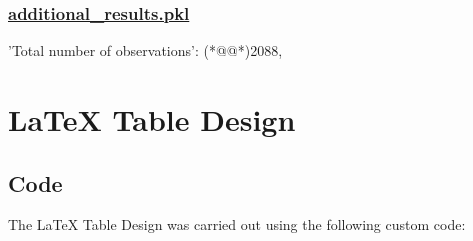 \documentclass[11pt]{article}
\begin{document}
\subsubsection*{\hyperlink{code-Data Analysis-additional-results-pkl}{additional\_results.pkl}}

\begin{codeoutput}
{
    'Total number of observations': (*@@*)2088,
}
\end{codeoutput}

\section{LaTeX Table Design}
\subsection{{Code}}
The LaTeX Table Design was carried out using the following custom code:
\end{document}
